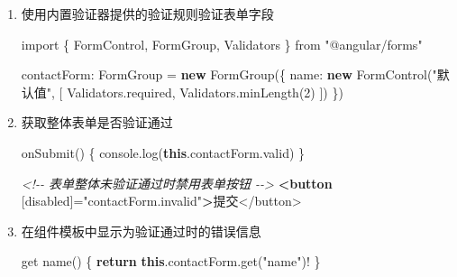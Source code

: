 \documentclass[
]{article}
\newenvironment{Shaded}{}{}
\newcommand{\AttributeTok}[1]{\textcolor[rgb]{0.49,0.56,0.16}{#1}}
\newcommand{\BuiltInTok}[1]{#1}
\newcommand{\CommentTok}[1]{\textcolor[rgb]{0.38,0.63,0.69}{\textit{#1}}}
\newcommand{\ControlFlowTok}[1]{\textcolor[rgb]{0.00,0.44,0.13}{\textbf{#1}}}
\newcommand{\DataTypeTok}[1]{\textcolor[rgb]{0.56,0.13,0.00}{#1}}
\newcommand{\DecValTok}[1]{\textcolor[rgb]{0.25,0.63,0.44}{#1}}
\newcommand{\FunctionTok}[1]{\textcolor[rgb]{0.02,0.16,0.49}{#1}}
\newcommand{\ImportTok}[1]{#1}
\newcommand{\KeywordTok}[1]{\textcolor[rgb]{0.00,0.44,0.13}{\textbf{#1}}}
\newcommand{\NormalTok}[1]{#1}
\newcommand{\OperatorTok}[1]{\textcolor[rgb]{0.40,0.40,0.40}{#1}}
\newcommand{\OtherTok}[1]{\textcolor[rgb]{0.00,0.44,0.13}{#1}}
\newcommand{\StringTok}[1]{\textcolor[rgb]{0.25,0.44,0.63}{#1}}
\begin{document}
\begin{enumerate}
\def\labelenumi{\arabic{enumi}.}
\item
  使用内置验证器提供的验证规则验证表单字段

\begin{Shaded}
\begin{Highlighting}[]
\ImportTok{import}\NormalTok{ \{ FormControl}\OperatorTok{,}\NormalTok{ FormGroup}\OperatorTok{,}\NormalTok{ Validators \} }\ImportTok{from} \StringTok{"@angular/forms"}

\NormalTok{contactForm}\OperatorTok{:}\NormalTok{ FormGroup }\OperatorTok{=} \KeywordTok{new} \FunctionTok{FormGroup}\NormalTok{(\{}
  \DataTypeTok{name}\OperatorTok{:} \KeywordTok{new} \FunctionTok{FormControl}\NormalTok{(}\StringTok{"默认值"}\OperatorTok{,}\NormalTok{ [}
\NormalTok{    Validators}\OperatorTok{.}\AttributeTok{required}\OperatorTok{,}
\NormalTok{    Validators}\OperatorTok{.}\FunctionTok{minLength}\NormalTok{(}\DecValTok{2}\NormalTok{)}
\NormalTok{  ])}
\NormalTok{\})}
\end{Highlighting}
\end{Shaded}
\item
  获取整体表单是否验证通过

\begin{Shaded}
\begin{Highlighting}[]
\FunctionTok{onSubmit}\NormalTok{() \{}
  \BuiltInTok{console}\OperatorTok{.}\FunctionTok{log}\NormalTok{(}\KeywordTok{this}\OperatorTok{.}\AttributeTok{contactForm}\OperatorTok{.}\AttributeTok{valid}\NormalTok{)}
\NormalTok{\}}
\end{Highlighting}
\end{Shaded}

\begin{Shaded}
\begin{Highlighting}[]
\CommentTok{\textless{}!{-}{-} 表单整体未验证通过时禁用表单按钮 {-}{-}\textgreater{}}
\KeywordTok{\textless{}button}\OtherTok{ [disabled]=}\StringTok{"contactForm.invalid"}\KeywordTok{\textgreater{}}\NormalTok{提交\textless{}/button\textgreater{}}
\end{Highlighting}
\end{Shaded}
\item
  在组件模板中显示为验证通过时的错误信息

\begin{Shaded}
\begin{Highlighting}[]
\NormalTok{get }\FunctionTok{name}\NormalTok{() \{}
  \ControlFlowTok{return} \KeywordTok{this}\OperatorTok{.}\AttributeTok{contactForm}\OperatorTok{.}\FunctionTok{get}\NormalTok{(}\StringTok{"name"}\NormalTok{)}\OperatorTok{!}
\NormalTok{\}}
\end{Highlighting}
\end{Shaded}


\end{enumerate}
\end{document}
